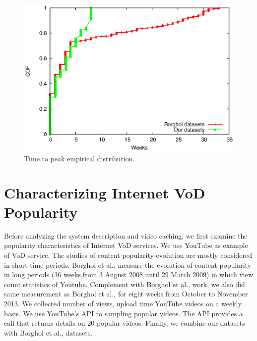\documentclass[10pt,final,journal,a4paper]{IEEEtran}
\begin{document}
\begin{figure}[!t]
\begin{center}
\includegraphics[scale=0.6]{graphs/timetopeak.eps}
\end{center}
\caption{Time to peak empirical distribution.}
\label{fig:timetopeak}
\end{figure} 

\section{Characterizing Internet VoD Popularity}\label{popularity}
Before analyzing the system description and video caching, we first examine the popularity characteristics of Internet VoD services.
We use YouTube as example of VoD service.
The studies of content popularity evolution are mostly considered in short time periods.
Borghol et al., \cite{Borghol:2011:CMP:2039452.2039717} measure the evolution of content popularity in long periods (36 weeks,from 3 August 2008 until 29 March 2009) in which view count statistics of Youtube. 
Complement with Borghol et al., \cite{Borghol:2011:CMP:2039452.2039717} work, we also did same measurement as Borghol et al., \cite{Borghol:2011:CMP:2039452.2039717} for eight weeks from October to November 2013.
We collected number of views, upload time YouTube videos on a weekly basis.
We use YouTube's API to sampling popular videos. 
The API provides a call that returns details on 20 popular videos.
Finally, we combine our datasets with Borghol et al.,\cite{Borghol:2011:CMP:2039452.2039717} datasets. 
\end{document}
